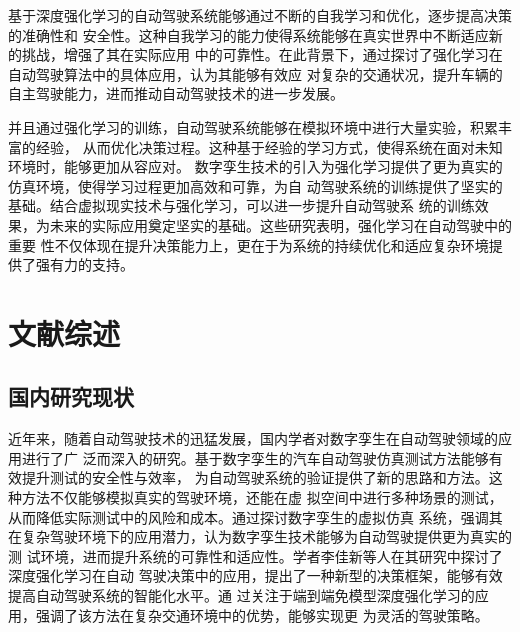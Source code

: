 基于深度强化学习的自动驾驶系统能够通过不断的自我学习和优化，逐步提高决策的准确性和
安全性。这种自我学习的能力使得系统能够在真实世界中不断适应新的挑战，增强了其在实际应用
中的可靠性。在此背景下，通过探讨了强化学习在自动驾驶算法中的具体应用，认为其能够有效应
对复杂的交通状况，提升车辆的自主驾驶能力，进而推动自动驾驶技术的进一步发展。

并且通过强化学习的训练，自动驾驶系统能够在模拟环境中进行大量实验，积累丰富的经验，
从而优化决策过程。这种基于经验的学习方式，使得系统在面对未知环境时，能够更加从容应对。
数字孪生技术的引入为强化学习提供了更为真实的仿真环境，使得学习过程更加高效和可靠，为自
动驾驶系统的训练提供了坚实的基础\cite{梁恩云2022面向自动驾驶仿真测试的数字孪生场景交互研究与实现}。结合虚拟现实技术与强化学习，可以进一步提升自动驾驶系
统的训练效果，为未来的实际应用奠定坚实的基础。这些研究表明，强化学习在自动驾驶中的重要
性不仅体现在提升决策能力上，更在于为系统的持续优化和适应复杂环境提供了强有力的支持。

\section{文献综述}

\subsection{国内研究现状}

近年来，随着自动驾驶技术的迅猛发展，国内学者对数字孪生在自动驾驶领域的应用进行了广
泛而深入的研究。基于数字孪生的汽车自动驾驶仿真测试方法能够有效提升测试的安全性与效率，
为自动驾驶系统的验证提供了新的思路和方法。这种方法不仅能够模拟真实的驾驶环境，还能在虚
拟空间中进行多种场景的测试，从而降低实际测试中的风险和成本\cite{文谢2023基于数字孪生的汽车自动驾驶仿真测试方法}。通过探讨数字孪生的虚拟仿真
系统，强调其在复杂驾驶环境下的应用潜力，认为数字孪生技术能够为自动驾驶提供更为真实的测
试环境，进而提升系统的可靠性和适应性\cite{彭博2023基于数字孪生的虚拟仿真系统研究与应用}。学者李佳新等人在其研究中探讨了深度强化学习在自动
驾驶决策中的应用，提出了一种新型的决策框架，能够有效提高自动驾驶系统的智能化水平。通
过关注于端到端免模型深度强化学习的应用，强调了该方法在复杂交通环境中的优势，能够实现更
为灵活的驾驶策略。

